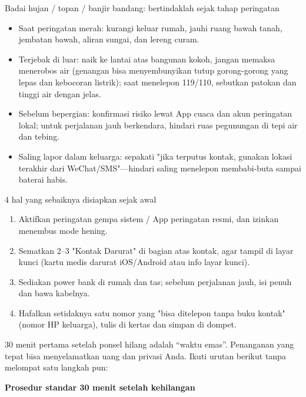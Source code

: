 \begin{tcbwarn}{Badai hujan / topan / banjir bandang: bertindaklah sejak tahap peringatan}
\begin{itemize}
  \item Saat peringatan merah: kurangi keluar rumah, jauhi ruang bawah tanah, jembatan bawah, aliran sungai, dan lereng curam.
  \item Terjebak di luar: naik ke lantai atas bangunan kokoh, jangan memaksa menerobos air (genangan bisa menyembunyikan tutup gorong-gorong yang lepas dan kebocoran listrik); saat menelepon 119/110, sebutkan patokan dan tinggi air dengan jelas.
  \item Sebelum bepergian: konfirmasi risiko lewat App cuaca dan akun peringatan lokal; untuk perjalanan jauh berkendara, hindari ruas pegunungan di tepi air dan tebing.
  \item Saling lapor dalam keluarga: sepakati "jika terputus kontak, gunakan lokasi terakhir dari WeChat/SMS"—hindari saling menelepon membabi-buta sampai baterai habis.
\end{itemize}

\end{tcbwarn}

\begin{tcbpractice}{4 hal yang sebaiknya disiapkan sejak awal}
\begin{enumerate}
  \item Aktifkan peringatan gempa sistem / App peringatan resmi, dan izinkan menembus mode hening.
  \item Sematkan 2–3 "Kontak Darurat" di bagian atas kontak, agar tampil di layar kunci (kartu medis darurat iOS/Android atau info layar kunci).
  \item Sediakan power bank di rumah dan tas; sebelum perjalanan jauh, isi penuh dan bawa kabelnya.
  \item Hafalkan setidaknya satu nomor yang "bisa ditelepon tanpa buku kontak" (nomor HP keluarga), tulis di kertas dan simpan di dompet.
\end{enumerate}

\end{tcbpractice}


30 menit pertama setelah ponsel hilang adalah “waktu emas”. Penanganan yang tepat bisa menyelamatkan uang dan privasi Anda. Ikuti urutan berikut tanpa melompat satu langkah pun:

\textbf{Prosedur standar 30 menit setelah kehilangan}\par

